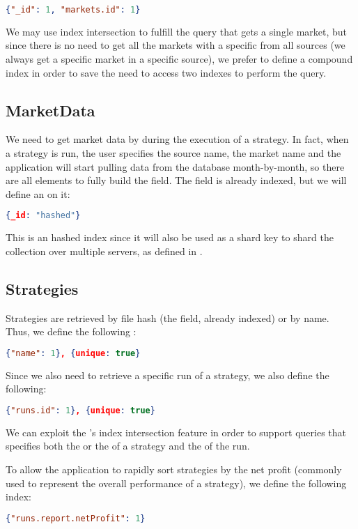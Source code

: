 \begin{lstlisting}[language=json]
{"_id": 1, "markets.id": 1}
\end{lstlisting}

We may use index intersection to fulfill the query that gets a single market,
but since there is no need to get all the markets with a specific  from
all sources (we always get a specific market in a specific source), we prefer to
define a compound index in order to save \mongodb{} the need to access two
indexes to perform the query.

\subsection{MarketData}

We need to get market data by  during the execution of a strategy. In
fact, when a strategy is run, the user specifies the source name, the market
name and the application will start pulling data from the database
month-by-month, so there are all elements to fully build the  field.
The  field is already indexed, but we will define an  on it:

\begin{lstlisting}[language=json]
{_id: "hashed"}
\end{lstlisting}

This is an hashed index since it will also be used as a shard key to shard the
collection over multiple servers, as defined in .

\subsection{Strategies}

Strategies are retrieved by file hash (the  field, already indexed)
or by name. Thus, we define the following :

\begin{lstlisting}[language=json]
{"name": 1}, {unique: true}
\end{lstlisting}

Since we also need to retrieve a specific run of a strategy, we also define the
following:

\begin{lstlisting}[language=json]
{"runs.id": 1}, {unique: true}
\end{lstlisting}

We can exploit the \mongodb's index intersection feature in order to support
queries that specifies both the  or the  of a strategy and
the  of the run.

To allow the application to rapidly sort strategies by the net profit (commonly
used to represent the overall performance of a strategy), we define the
following index:

\begin{lstlisting}[language=json]
{"runs.report.netProfit": 1}
\end{lstlisting}

